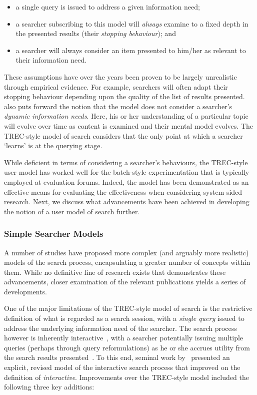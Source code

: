 \begin{itemize}
    \item{a single query is issued to address a given information need;}
    \item{a searcher subscribing to this model will \emph{always} examine to a fixed depth in the presented results (their \emph{stopping behaviour}); and}
    \item{a searcher will always consider an item presented to him/her as relevant to their information need.}
\end{itemize}

These assumptions have over the years been proven to be largely unrealistic through empirical evidence. For example, searchers will often adapt their stopping behaviour depending upon the quality of the list of results presented.~\cite{borlund2003iir_model} also puts forward the notion that the model does not consider a searcher's \emph{dynamic information needs}. Here, his or her understanding of a particular topic will evolve over time as content is examined and their mental model evolves. The TREC-style model of search considers that the only point at which a searcher `learns' is at the querying stage.

While deficient in terms of considering a searcher's behaviours, the TREC-style user model has worked well for the batch-style experimentation that is typically employed at evaluation forums. Indeed, the model has been demonstrated as an effective means for evaluating the effectiveness when considering system sided research. Next, we discuss what advancements have been achieved in developing the notion of a user model of search further.

\subsubsection{Simple Searcher Models}
A number of studies have proposed more complex (and arguably more realistic) models of the search process, encapsulating a greater number of concepts within them. While no definitive line of research exists that demonstrates these advancements, closer examination of the relevant publications yields a series of developments.

One of the major limitations of the TREC-style model of search is the restrictive definition of what is regarded as a search session, with a \emph{single query} issued to address the underlying information need of the searcher. The search process however is inherently interactive~\citep{baskaya2013behavioural_factors}, with a searcher potentially issuing multiple queries (perhaps through query reformulations) as he or she accrues utility from the search results presented~\citep{ingwersen2005theturn}. To this end, seminal work by~\cite{baskaya2013behavioural_factors} presented an explicit, revised model of the interactive search process that improved on the definition of \emph{interactive}. Improvements over the TREC-style model included the following three key additions:

